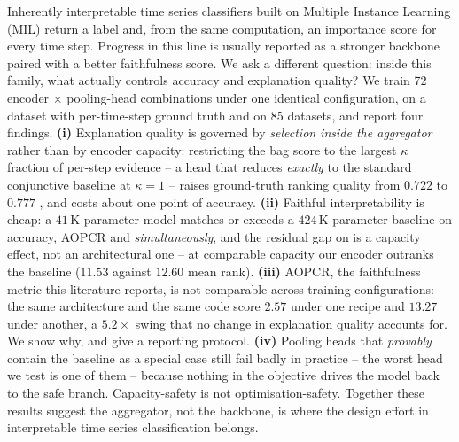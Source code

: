 
Inherently interpretable time series classifiers built on Multiple Instance Learning (MIL) return a
label and, from the same computation, an importance score for every time step. Progress in this
line is usually reported as a stronger backbone paired with a better faithfulness score. We ask a
different question: inside this family, what actually controls accuracy and explanation quality? We
train 72 encoder $\times$ pooling-head combinations under one identical configuration, on a dataset
with per-time-step ground truth and on 85 \ucr{} datasets, and report four findings. \textbf{(i)}
Explanation quality is governed by \emph{selection inside the aggregator} rather than by encoder
capacity: restricting the bag score to the largest $\kappa$ fraction of per-step evidence -- a head
that reduces \emph{exactly} to the standard conjunctive baseline at $\kappa = 1$ -- raises
ground-truth ranking quality from $0.722$ to $0.777$ \ndcg{}, and costs about one point of accuracy.
\textbf{(ii)} Faithful interpretability is cheap: a $41$\,K-parameter model matches or exceeds a
$424$\,K-parameter \millet{} baseline on accuracy, AOPCR and \ndcg{} \emph{simultaneously}, and the
residual gap on \ucr{} is a capacity effect, not an architectural one -- at comparable capacity our
encoder outranks the baseline ($11.53$ against $12.60$ mean rank). \textbf{(iii)} AOPCR, the
faithfulness metric this literature reports, is not comparable across training configurations: the
same architecture and the same code score $2.57$ under one recipe and $13.27$ under another, a
$5.2\times$ swing that no change in explanation quality accounts for. We show why, and give a
reporting protocol. \textbf{(iv)} Pooling heads that \emph{provably} contain the baseline as a
special case still fail badly in practice -- the worst head we test is one of them -- because
nothing in the objective drives the model back to the safe branch. Capacity-safety is not
optimisation-safety. Together these results suggest the aggregator, not the backbone, is where the
design effort in interpretable time series classification belongs.
